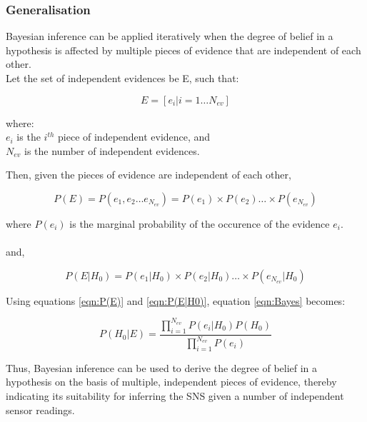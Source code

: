 \documentclass{sig-alternate-10pt}
\begin{document}

\subsubsection{Generalisation}

Bayesian inference can be applied iteratively when the degree of belief in a hypothesis is affected by multiple pieces of evidence that are independent of each other.\\

Let the set of independent evidences be E, such that:

\begin{equation*}
E = [e_i|i = 1\ldots N_{ev}]
\end{equation*}

\noindent
where:\\
\noindent
$e_i$ is the $i^{th}$ piece of independent evidence, and\\
\noindent
$N_{ev}$ is the number of independent evidences.

Then, given the pieces of evidence are independent of each other,

\begin{equation} \label{eqn:P(E)}
P(E) = P(e_1,e_2\ldots e_{N_{ev}}) = P(e_1) \times P(e_2)\ldots \times P(e_{N_{ev}})
\end{equation}

\noindent
where $P(e_i)$ is the marginal probability of the occurence of the evidence $e_i$.\\ \\
\noindent
and,

\begin{equation} \label{eqn:P(E|H0)}
P(E|H_0) = P(e_1|H_0) \times P(e_2|H_0) \ldots \times P(e_{N_{ev}}|H_0)
\end{equation}

Using equations \ref{eqn:P(E)} and \ref{eqn:P(E|H0)}, equation \ref{eqn:Bayes} becomes:

\begin{equation} \label{eqn:BayesMote}
P(H_0|E) = \frac{\prod_{i=1}^{N_{ev}}P(e_i|H_0) P(H_0)}{\prod_{i=1}^{N_{ev}}P(e_i)}
\end{equation}

Thus, Bayesian inference can be used to derive the degree of belief in a hypothesis on the basis of multiple, independent pieces of evidence, thereby indicating its suitability for inferring the SNS given a number of independent sensor readings.
\end{document}
